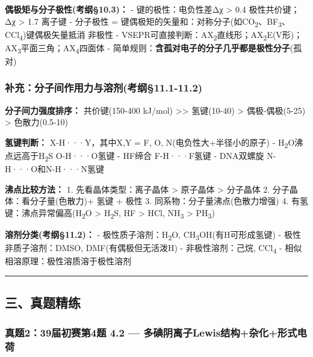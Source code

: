 \textbf{偶极矩与分子极性(考纲§10.3)：}
- 键的极性：电负性差Δχ \textgreater{} 0.4 \箭 极性共价键；Δχ \textgreater{} 1.7 \箭 离子键
- 分子极性 = 键偶极矩的矢量和：对称分子(如CO\textsubscript{2}、BF\textsubscript{3}、CCl\textsubscript{4})\箭 键偶极矢量抵消 \箭 非极性
- VSEPR可直接判断：AX\textsubscript{2}直线形；AX\textsubscript{2}E(V形)；AX\textsubscript{3}平面三角；AX\textsubscript{4}四面体
- 简单规则：\textbf{含孤对电子的分子几乎都是极性分子}(孤对)

\subsubsection{补充：分子间作用力与溶剂(考纲§11.1-11.2)}\label{ux8865ux5145ux5206ux5b50ux95f4ux4f5cux7528ux529bux4e0eux6eb6ux5242ux8003ux7eb211.1-11.2}

\textbf{分子间力强度排序：}
共价键(150-400 kJ/mol) \textgreater\textgreater{} 氢键(10-40) \textgreater{} 偶极-偶极(5-25) \textgreater{} 色散力(0.5-10)

\textbf{氢键判断：} X-H···Y，其中X,Y = F, O, N(电负性大+半径小的原子)
- H\textsubscript{2}O沸点远高于H\textsubscript{2}S \箭 O-H···O氢键
- HF缔合 \箭 F-H···F氢键
- DNA双螺旋 \箭 N-H···O和N-H···N氢键

\textbf{沸点比较方法：}
1. 先看晶体类型：离子晶体 \textgreater{} 原子晶体 \textgreater{} 分子晶体
2. 分子晶体：看分子量(色散力)+ 氢键 + 极性
3. 同系物：分子量 \箭 沸点(色散力增强)
4. 有氢键：沸点异常偏高(H\textsubscript{2}O \textgreater{} H\textsubscript{2}S, HF \textgreater{} HCl, NH\textsubscript{3} \textgreater{} PH\textsubscript{3})

\textbf{溶剂分类(考纲§11.2)：}
- 极性质子溶剂：H\textsubscript{2}O, CH\textsubscript{3}OH(有H可形成氢键)
- 极性非质子溶剂：DMSO, DMF(有偶极但无活泼H)
- 非极性溶剂：己烷, CCl\textsubscript{4}
- 相似相溶原理：极性溶质溶于极性溶剂

\begin{center}\rule{0.5\linewidth}{0.5pt}\end{center}

\subsection{三、真题精练}\label{ux4e09ux771fux9898ux7cbeux7ec3}

\subsubsection{真题2：39届初赛第4题 4.2 --- 多碘阴离子Lewis结构+杂化+形式电荷}\label{ux771fux9898239ux5c4aux521dux8d5bux7b2c4ux9898-4.2-ux591aux7898ux9634ux79bbux5b50lewisux7ed3ux6784ux6742ux5316ux5f62ux5f0fux7535ux8377}

